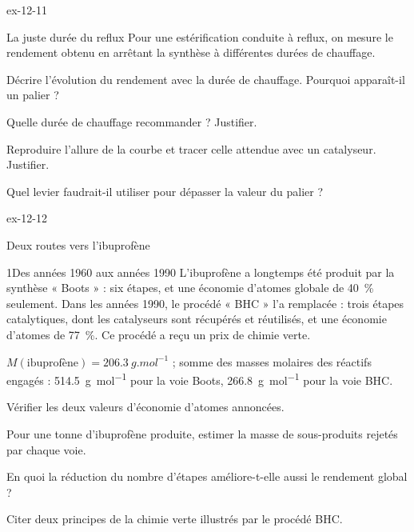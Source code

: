 \begin{blocLivre}{ex-12-11}
\begin{exercice}[2]{La juste durée du reflux}
Pour une estérification conduite à reflux, on mesure le rendement obtenu en arrêtant la synthèse à différentes durées
de chauffage.
\begin{questions}
\item Décrire l'évolution du rendement avec la durée de chauffage. Pourquoi apparaît-il un palier ?
\item Quelle durée de chauffage recommander ? Justifier.
\item Reproduire l'allure de la courbe et tracer celle attendue avec un catalyseur. Justifier.
\item Quel levier faudrait-il utiliser pour dépasser la valeur du palier ?
\end{questions}
\end{exercice}
\end{blocLivre}
\begin{blocLivre}{ex-12-12}
\begin{exercice}[3]{Deux routes vers l'ibuprofène}
\begin{docu}{1}{Des années 1960 aux années 1990}
L'ibuprofène a longtemps été produit par la synthèse « Boots » : six étapes, et une économie d'atomes globale de
40~\% seulement. Dans les années 1990, le procédé « BHC » l'a remplacée : trois étapes catalytiques, dont les
catalyseurs sont récupérés et réutilisés, et une économie d'atomes de 77~\%. Ce procédé a reçu un prix de chimie
verte.
\end{docu}
\begin{donnees}
$M(\text{ibuprofène})=\qty{206,3}{g.mol^{-1}}$ ; somme des masses molaires des réactifs engagés :
\qty{514,5}{g.mol^{-1}} pour la voie Boots, \qty{266,8}{g.mol^{-1}} pour la voie BHC.
\end{donnees}
\begin{questions}
\item Vérifier les deux valeurs d'économie d'atomes annoncées.
\item \initiative Pour une tonne d'ibuprofène produite, estimer la masse de sous-produits rejetés par chaque voie.
\item En quoi la réduction du nombre d'étapes améliore-t-elle aussi le rendement global ?
\item Citer deux principes de la chimie verte illustrés par le procédé BHC.
\end{questions}
\end{exercice}
\end{blocLivre}
